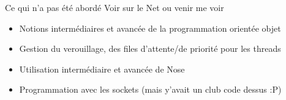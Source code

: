 \documentclass{beamer}
\begin{document}
\begin{frame}{Ce qui n'a pas été abordé}
Voir sur le Net ou venir me voir
\begin{itemize}
 \item Notions intermédiaires et avancée de la programmation orientée objet
 \item Gestion du verouillage, des files d'attente/de priorité pour les threads
 \item Utilisation intermédiaire et avancée de Nose
 \item Programmation avec les sockets (mais y'avait un club code dessus :P)
\end{itemize}
\end{frame}
\end{document}

